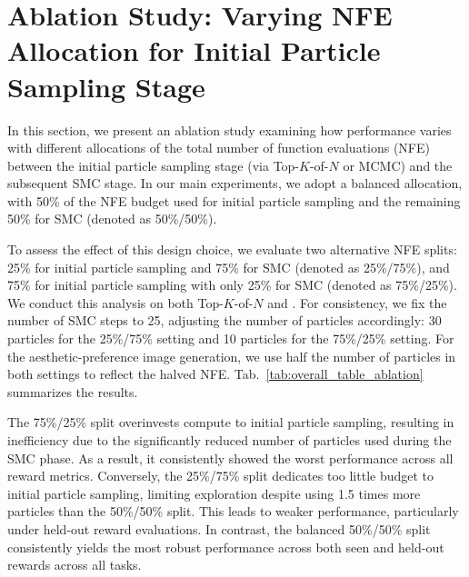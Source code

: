\section{Ablation Study: Varying NFE Allocation for Initial Particle Sampling Stage}
\label{sec:appx:ablation}

In this section, we present an ablation study examining how performance varies with different allocations of the total number of function evaluations (NFE) between the initial particle sampling stage (via Top-$K$-of-$N$ or MCMC) and the subsequent SMC stage. In our main experiments, we adopt a balanced allocation, with 50\% of the NFE budget used for initial particle sampling and the remaining 50\% for SMC (denoted as 50\%/50\%).

To assess the effect of this design choice, we evaluate two alternative NFE splits: 25\% for initial particle sampling and 75\% for SMC (denoted as 25\%/75\%), and 75\% for initial particle sampling with only 25\% for SMC (denoted as 75\%/25\%). We conduct this analysis on both Top-$K$-of-$N$ and \methodname{}. For consistency, we fix the number of SMC steps to 25, adjusting the number of particles accordingly: 30 particles for the 25\%/75\% setting and 10 particles for the 75\%/25\% setting. For the aesthetic-preference image generation, we use half the number of particles in both settings to reflect the halved NFE. Tab.~\ref{tab:overall_table_ablation} summarizes the results.

The 75\%/25\% split overinvests compute to initial particle sampling, resulting in inefficiency due to the significantly reduced number of particles used during the SMC phase. As a result, it consistently showed the worst performance across all reward metrics. Conversely, the 25\%/75\% split dedicates too little budget to initial particle sampling, limiting exploration despite using 1.5 times more particles than the 50\%/50\% split. This leads to weaker performance, particularly under held-out reward evaluations. In contrast, the balanced 50\%/50\% split consistently yields the most robust performance across both seen and held-out rewards across all tasks.
\vspace{0.75cm}


